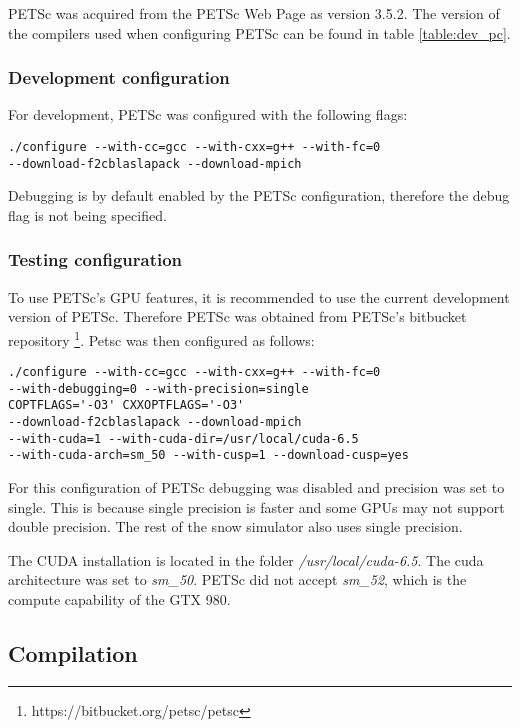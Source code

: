 PETSc was acquired from the PETSc Web Page\cite{petsc-web-page} as version 3.5.2. 
The version of the compilers used when configuring PETSc can be found in table 
\ref{table:dev_pc}.

\subsubsection{Development configuration}

For development, PETSc was configured with the following flags:
\lstset{language=bash}
\begin{lstlisting}
./configure --with-cc=gcc --with-cxx=g++ --with-fc=0 
--download-f2cblaslapack --download-mpich
\end{lstlisting}
Debugging is by default enabled by the PETSc configuration, therefore the debug 
flag is not being specified.

\subsubsection{Testing configuration}

To use PETSc's GPU features, it is recommended to use the current development 
version of PETSc. Therefore PETSc was obtained from PETSc's bitbucket repository
\footnote{https://bitbucket.org/petsc/petsc}. Petsc was then configured as follows:
\lstset{language=bash}
\begin{lstlisting}
./configure --with-cc=gcc --with-cxx=g++ --with-fc=0
--with-debugging=0 --with-precision=single
COPTFLAGS='-O3' CXXOPTFLAGS='-O3' 
--download-f2cblaslapack --download-mpich
--with-cuda=1 --with-cuda-dir=/usr/local/cuda-6.5 
--with-cuda-arch=sm_50 --with-cusp=1 --download-cusp=yes
\end{lstlisting}
For this configuration of PETSc debugging was disabled and precision was set to 
single. This is because single precision is faster and some GPUs may not support 
double precision. The rest of the snow simulator also uses single precision.

The CUDA installation is located in the folder \emph{/usr/local/cuda-6.5}. The 
cuda architecture was set to \emph{sm\_50}. PETSc did not accept \emph{sm\_52}, 
which is the compute capability of the GTX 980. 

\subsection{Compilation}

